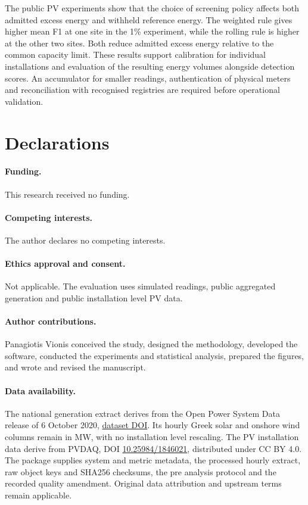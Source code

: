 \documentclass[11pt,a4paper]{article}
\begin{document}
The public PV experiments show that the choice of screening policy affects both admitted excess energy and withheld reference energy. The weighted rule gives higher mean F1 at one site in the 1\% experiment, while the rolling rule is higher at the other two sites. Both reduce admitted excess energy relative to the common capacity limit. These results support calibration for individual installations and evaluation of the resulting energy volumes alongside detection scores. An accumulator for smaller readings, authentication of physical meters and reconciliation with recognised registries are required before operational validation.

\section*{Declarations}
\paragraph{Funding.} This research received no funding.
\paragraph{Competing interests.} The author declares no competing interests.
\paragraph{Ethics approval and consent.} Not applicable. The evaluation uses simulated readings, public aggregated generation and public installation level PV data.
\paragraph{Author contributions.} Panagiotis Vionis conceived the study, designed the methodology, developed the software, conducted the experiments and statistical analysis, prepared the figures, and wrote and revised the manuscript.
\paragraph{Data availability.} The national generation extract derives from the Open Power System Data release of 6 October 2020, \href{https://doi.org/10.25832/time_series/2020-10-06}{dataset DOI}. Its hourly Greek solar and onshore wind columns remain in MW, with no installation level rescaling. The PV installation data derive from PVDAQ, DOI \href{https://doi.org/10.25984/1846021}{10.25984/1846021}, distributed under CC BY 4.0. The package supplies system and metric metadata, the processed hourly extract, raw object keys and SHA256 checksums, the pre analysis protocol and the recorded quality amendment. Original data attribution and upstream terms remain applicable.
\end{document}
